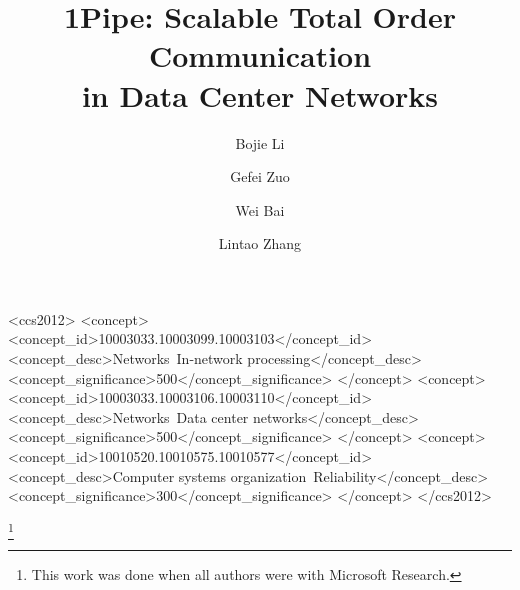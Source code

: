 \documentclass[sigconf,9pt]{acmart}
\numberwithin{equation}{section}
\begin{document}


\title{1Pipe: Scalable Total Order Communication \\in Data Center Networks}


\author{Bojie Li}

\author{Gefei Zuo}

\author{Wei Bai}

\author{Lintao Zhang}

\renewcommand{\shorttitle}{1Pipe: Scalable Total Order Communication in Data Center Networks}
\renewcommand{\shortauthors}{Bojie Li, Gefei Zuo, Wei Bai, and Lintao Zhang}



\begin{CCSXML}
	<ccs2012>
	<concept>
	<concept_id>10003033.10003099.10003103</concept_id>
	<concept_desc>Networks~In-network processing</concept_desc>
	<concept_significance>500</concept_significance>
	</concept>
	<concept>
	<concept_id>10003033.10003106.10003110</concept_id>
	<concept_desc>Networks~Data center networks</concept_desc>
	<concept_significance>500</concept_significance>
	</concept>
	<concept>
	<concept_id>10010520.10010575.10010577</concept_id>
	<concept_desc>Computer systems organization~Reliability</concept_desc>
	<concept_significance>300</concept_significance>
	</concept>
	</ccs2012>
\end{CCSXML}



\thanks{This work was done when all authors were with Microsoft Research.}

\maketitle














{\footnotesize

}

\appendix

\end{document}

